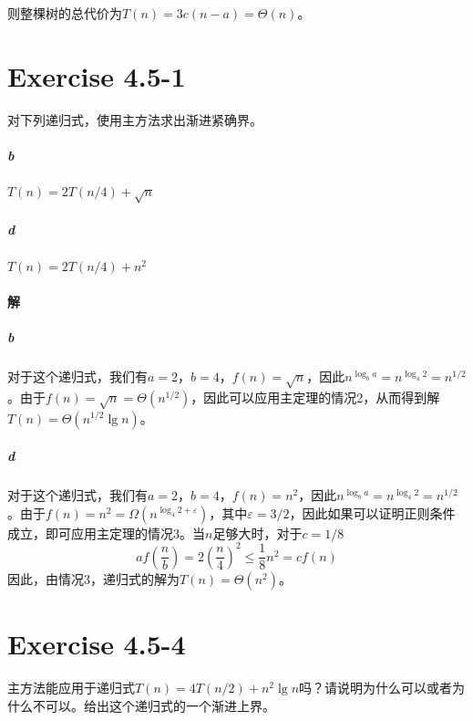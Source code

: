\documentclass{article}
\begin{document}
则整棵树的总代价为$T(n) = 3c(n-a) = \Theta(n)$。
\\

\section{Exercise 4.5-1}
对下列递归式，使用主方法求出渐进紧确界。
\subparagraph{b}
$T(n)=2T(n/4)+\sqrt{n}$
\subparagraph{d}
$T(n)=2T(n/4)+n^2$
\\

\paragraph{解}
\subparagraph{b}
对于这个递归式，我们有$a=2$，$b=4$，$f(n)=\sqrt{n}$，因此$n^{\log_b{a}}=n^{\log_4{2}}=n^{1/2}$。由于$f(n)=\sqrt{n}=\Theta\left(n^{1/2}\right)$，因此可以应用主定理的情况2，从而得到解$T(n)=\Theta\left(n^{1/2} \lg{n}\right)$。
\subparagraph{d}
对于这个递归式，我们有$a=2$，$b=4$，$f(n)=n^2$，因此$n^{\log_b{a}}=n^{\log_4{2}}=n^{1/2}$。由于$f(n)=n^2=\Omega\left(n^{\log_4{2}+\varepsilon}\right)$，其中$\varepsilon = 3/2$，因此如果可以证明正则条件成立，即可应用主定理的情况3。当$n$足够大时，对于$c=1/8$
\begin{equation*}
    a f\left(\frac{n}{b}\right) = 2\left(\frac{n}{4}\right)^2 \leq \frac{1}{8}n^2 = c f(n)
\end{equation*}
因此，由情况3，递归式的解为$T(n) = \Theta\left(n^2\right)$。
\\

\section{Exercise 4.5-4}
主方法能应用于递归式$T(n)=4T(n/2)+n^2\lg{n}$吗？请说明为什么可以或者为什么不可以。给出这个递归式的一个渐进上界。
\\
\end{document}
